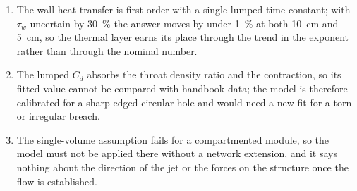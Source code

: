 \begin{enumerate}[label=(\arabic*),leftmargin=*]
  \item The wall heat transfer is first order with a single lumped time
        constant; with $\tau_w$ uncertain by \SI{30}{\percent} the answer
        moves by under \SI{1}{\percent} at both \SI{10}{cm} and
        \SI{5}{cm}, so the thermal layer earns its place through the
        trend in the exponent rather than through the nominal number.
  \item The lumped $C_d$ absorbs the throat density ratio and the
        contraction, so its fitted value cannot be compared with handbook
        data; the model is therefore calibrated for a sharp-edged circular
        hole and would need a new fit for a torn or irregular breach.
  \item The single-volume assumption fails for a compartmented module,
        so the model must not be applied there without a network
        extension, and it says nothing about the direction of the jet or
        the forces on the structure once the flow is established.
\end{enumerate}
